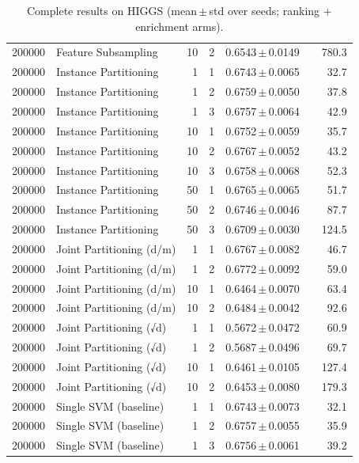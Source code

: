 \begin{table}[ht]
\begin{tabular}{rlrrccr}
200000 & Feature Subsampling & 10 & 2 & 0.6543\,$\pm$\,0.0149 &  & 780.3 \\
200000 & Instance Partitioning & 1 & 1 & 0.6743\,$\pm$\,0.0065 &  & 32.7 \\
200000 & Instance Partitioning & 1 & 2 & 0.6759\,$\pm$\,0.0050 &  & 37.8 \\
200000 & Instance Partitioning & 1 & 3 & 0.6757\,$\pm$\,0.0064 &  & 42.9 \\
200000 & Instance Partitioning & 10 & 1 & 0.6752\,$\pm$\,0.0059 &  & 35.7 \\
200000 & Instance Partitioning & 10 & 2 & 0.6767\,$\pm$\,0.0052 &  & 43.2 \\
200000 & Instance Partitioning & 10 & 3 & 0.6758\,$\pm$\,0.0068 &  & 52.3 \\
200000 & Instance Partitioning & 50 & 1 & 0.6765\,$\pm$\,0.0065 &  & 51.7 \\
200000 & Instance Partitioning & 50 & 2 & 0.6746\,$\pm$\,0.0046 &  & 87.7 \\
200000 & Instance Partitioning & 50 & 3 & 0.6709\,$\pm$\,0.0030 &  & 124.5 \\
200000 & Joint Partitioning (d/m) & 1 & 1 & 0.6767\,$\pm$\,0.0082 &  & 46.7 \\
200000 & Joint Partitioning (d/m) & 1 & 2 & 0.6772\,$\pm$\,0.0092 &  & 59.0 \\
200000 & Joint Partitioning (d/m) & 10 & 1 & 0.6464\,$\pm$\,0.0070 &  & 63.4 \\
200000 & Joint Partitioning (d/m) & 10 & 2 & 0.6484\,$\pm$\,0.0042 &  & 92.6 \\
200000 & Joint Partitioning (√d) & 1 & 1 & 0.5672\,$\pm$\,0.0472 &  & 60.9 \\
200000 & Joint Partitioning (√d) & 1 & 2 & 0.5687\,$\pm$\,0.0496 &  & 69.7 \\
200000 & Joint Partitioning (√d) & 10 & 1 & 0.6461\,$\pm$\,0.0105 &  & 127.4 \\
200000 & Joint Partitioning (√d) & 10 & 2 & 0.6453\,$\pm$\,0.0080 &  & 179.3 \\
200000 & Single SVM (baseline) & 1 & 1 & 0.6743\,$\pm$\,0.0073 &  & 32.1 \\
200000 & Single SVM (baseline) & 1 & 2 & 0.6757\,$\pm$\,0.0055 &  & 35.9 \\
200000 & Single SVM (baseline) & 1 & 3 & 0.6756\,$\pm$\,0.0061 &  & 39.2 \\
\bottomrule
\end{tabular}
\caption{Complete results on HIGGS (mean\,$\pm$\,std over seeds; ranking + enrichment arms).}
\label{tab:app_higgs}
\end{table}
